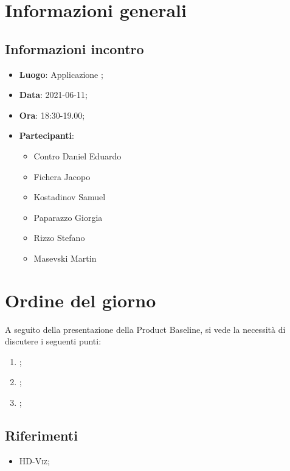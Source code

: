 \documentclass{article}
\begin{document}


\section{Informazioni generali}
\label{sec:info_generali}

\subsection{Informazioni incontro}
\label{sub:info_incontro}

\begin{itemize}
	\item \textbf{Luogo}: Applicazione ;
	\item \textbf{Data}: 2021-06-11;
	\item \textbf{Ora}: 18:30-19.00;
	\item \textbf{Partecipanti}:
	\begin{itemize}
		\item Contro Daniel Eduardo
		\item Fichera Jacopo
		\item Kostadinov Samuel
		\item Paparazzo Giorgia
		\item Rizzo Stefano
		\item Masevski Martin
	\end{itemize}
\end{itemize}

\section{Ordine del giorno}%
\label{sec:ordine_del_giorno}
A seguito della presentazione della Product Baseline, si vede la necessità di discutere i seguenti punti:
\begin{enumerate}
	\item {};
	\item {};
	\item {};
\end{enumerate}


\subsection{Riferimenti}%
\label{sub:riferimenti}
\begin{itemize}
    \item \textsc{HD-Viz};
    \end{itemize}
\end{document}

